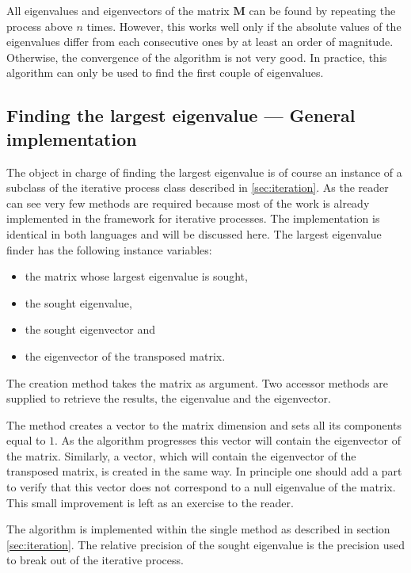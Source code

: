 All eigenvalues and eigenvectors of the matrix $\textbf{M}$ can be
found by repeating the process above $n$ times. However, this
works well only if the absolute values of the eigenvalues differ
from each consecutive ones by at least an order of magnitude.
Otherwise, the convergence of the algorithm is not very good. In
practice, this algorithm can only be used to find the first couple
of eigenvalues.

\subsection{Finding the largest eigenvalue --- General implementation}
The object in charge of finding the largest eigenvalue is of course an instance
of a subclass of the iterative process class described in
\ref{sec:iteration}. As the reader can see very few methods are
required because most of the work is already implemented in the
framework for iterative processes. The implementation is identical
in both languages and will be discussed here. The largest
eigenvalue finder has the following instance variables:
\begin{itemize}
  \item {} the matrix whose largest eigenvalue is sought,
  \item {} the sought eigenvalue,
  \item {} the sought eigenvector and
  \item {} the eigenvector of the
  transposed matrix.
\end{itemize}
The creation method takes the matrix as argument. Two accessor
methods are supplied to retrieve the results, the eigenvalue and
the eigenvector.

The method  creates a vector to the
matrix dimension and sets all its components equal to $1$.
As the algorithm progresses this vector will contain the eigenvector of
the matrix.
Similarly, a vector, which will contain the eigenvector of the transposed matrix, is created in the same way.
In principle one should add a part to verify that this vector does
not correspond to a null eigenvalue of the matrix.
This small improvement is left as an exercise to the reader.

The algorithm is implemented within the single method  as described in section \ref{sec:iteration}.
The relative precision of the sought eigenvalue is the precision
used to break out of the iterative process.


